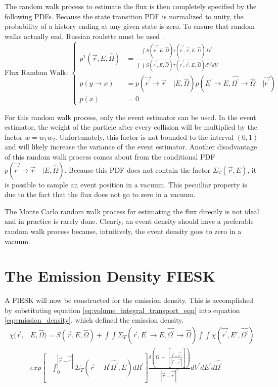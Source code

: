 The random walk process to estimate the flux is then completely specified by
the following PDFs. Because the state transition PDF is normalized to unity, 
the probability of a history ending at any given state is zero. To ensure that
random walks actually end, Russian roulette must be used 
\citep{spanier_monte_1969}. 
\begin{equation}
  \text{Flux Random Walk: }
  \begin{cases}
    p^1(\vec{r},E,\hat{\Omega}) & = \frac{\int S(\vec{r^{'}},E,\hat{\Omega})
    \tau(\vec{r^{'}},\vec{r},E,\hat{\Omega}) dV^{'}}{\int\int S(\vec{r^{'}},E,\hat{\Omega})
    \tau(\vec{r^{'}},\vec{r},E,\hat{\Omega}) dV^{'} dV} \\
    p(y \to x) & = p(\vec{r^{'}} \to \vec{r}\quad| E,\hat{\Omega})
    p(E^{'} \to E, \hat{\Omega^{'}} \to \hat{\Omega}\quad|\vec{r^{'}}) \\
    p(x) & = 0
  \end{cases}
  \label{eq:flux_random_walk_pdfs}
\end{equation}

For this random walk process, only the event estimator can be used. In the 
event estimator, the weight of the particle after every collision will be 
multiplied by the factor $w = w_1w_2$. Unfortunately, this factor is not 
bounded to the interval $(0,1)$ and will likely increase the variance of the 
event estimator. Another disadvantage of this random walk process comes about 
from the conditional PDF $p(\vec{r^{'}} \to \vec{r}\quad| E,\hat{\Omega})$. 
Because this PDF does not contain the factor $\Sigma_T(\vec{r},E)$, it is 
possible to sample an event position in a vacuum. This pecuiliar property is 
due to the fact that the flux does not go to zero in a vacuum.

The Monte Carlo random walk process for estimating the flux directly is not 
ideal and in practice is rarely done. Clearly, an event density should have
a preferable random walk process because, intuitively, the event density
goes to zero in a vacuum. 

\section{The Emission Density FIESK}
A FIESK will now be constructed for the emission density. This is accomplished 
by substituting equation \ref{eq:volume_integral_transport_eqn} into equation 
\ref{eq:emission_density}, which defined the emission density. 
\begin{equation*}
  \begin{split}
    \chi(\vec{r},&E,\hat{\Omega}) = S(\vec{r},E,\hat{\Omega}) +
    \int\int \Sigma_T(\vec{r},E^{'} \to E, \hat{\Omega^{'}} \to \hat{\Omega})
    \int\int \chi(\vec{r^{'}},E',\hat{\Omega^{'}}) \\
    & exp\left[-\int_0^{|\vec{r} - \vec{r^{'}}|} 
      \Sigma_T(\vec{r}-R^{'}\hat{\Omega^{'}},E)dR^{'} \right]
    \frac{\delta \left(\Omega^{'} - \left[\frac{\vec{r} - \vec{r^{'}}}
        {|\vec{r} - \vec{r^{'}}|}\right]\right)}
    {|\vec{r} - \vec{r^{'}}|^2} dV^{'}dE^{'}d\hat{\Omega^{'}}
  \end{split}
\end{equation*}

